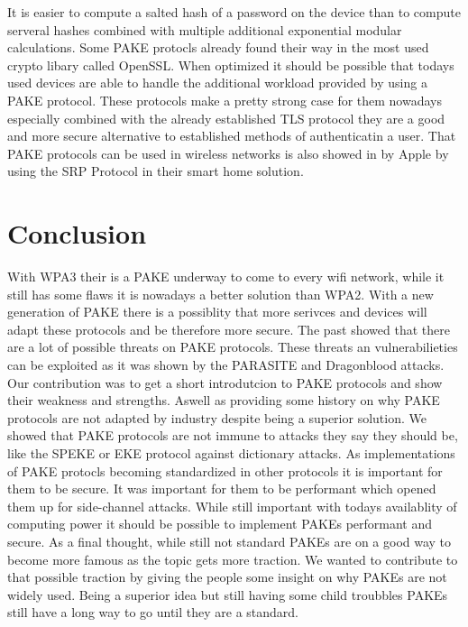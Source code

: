 \documentclass[journal]{IEEEtran}
\begin{document}
It is easier to compute a salted hash of a password on the device than to compute serveral hashes combined with multiple additional exponential modular calculations. 
Some PAKE protocls already found their way in the most used crypto libary called OpenSSL. 
When optimized it should be possible that todays used devices are able to handle the additional workload provided by using a PAKE protocol. 
These protocols make a pretty strong case for them nowadays especially combined with the already established TLS protocol they are a good and more secure alternative to established methods of authenticatin a user.
That PAKE protocols can be used in wireless networks is also showed in by Apple by using the SRP Protocol in their smart home solution.

\section{Conclusion}
With WPA3 their is a PAKE underway to come to every wifi network, while it still has some flaws it is nowadays a better solution than WPA2.
With a new generation of PAKE there is a possiblity that more serivces and devices will adapt these protocols and be therefore more secure.
The past showed that there are a lot of possible threats on PAKE protocols.
These threats an vulnerabilieties can be exploited as it was shown by the PARASITE and Dragonblood attacks.
Our contribution was to get a short introdutcion to PAKE protocols and show their weakness and strengths. 
Aswell as providing some history on why PAKE protocols are not adapted by industry despite being a superior solution.
We showed that PAKE protocols are not immune to attacks they say they should be, like the SPEKE or EKE protocol against dictionary attacks.
As implementations of PAKE protocls becoming standardized in other protocols it is important for them to be secure.
It was important for them to be performant which opened them up for side-channel attacks. While still important with todays availablity of computing power it should be possible to implement PAKEs performant and secure. 
As a final thought, while still not standard PAKEs are on a good way to become more famous as the topic gets more traction.
We wanted to contribute to that possible traction by giving the people some insight on why PAKEs are not widely used. 
Being a superior idea but still having some child troubbles PAKEs still have a long way to go until they are a standard.
\end{document}
